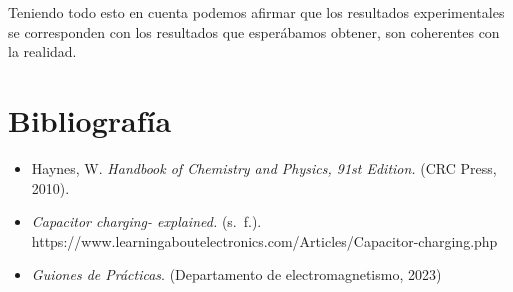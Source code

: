 \documentclass[a4paper,12pt,titlepage]{article}
\begin{document}
Teniendo todo esto en cuenta podemos afirmar que los resultados experimentales se corresponden con los resultados que esperábamos obtener, son coherentes con la realidad. 

\section{Bibliografía}

\begin{itemize}
    \item Haynes, W. \textit{Handbook of Chemistry and Physics, 91st Edition.} (CRC Press, 2010).
    \item \textit{Capacitor charging- explained.} (s. f.). https://www.learningaboutelectronics.com/Articles\newline/Capacitor-charging.php
    \item \textit{Guiones de Prácticas}. (Departamento de electromagnetismo, 2023)
\end{itemize}
\end{document}
